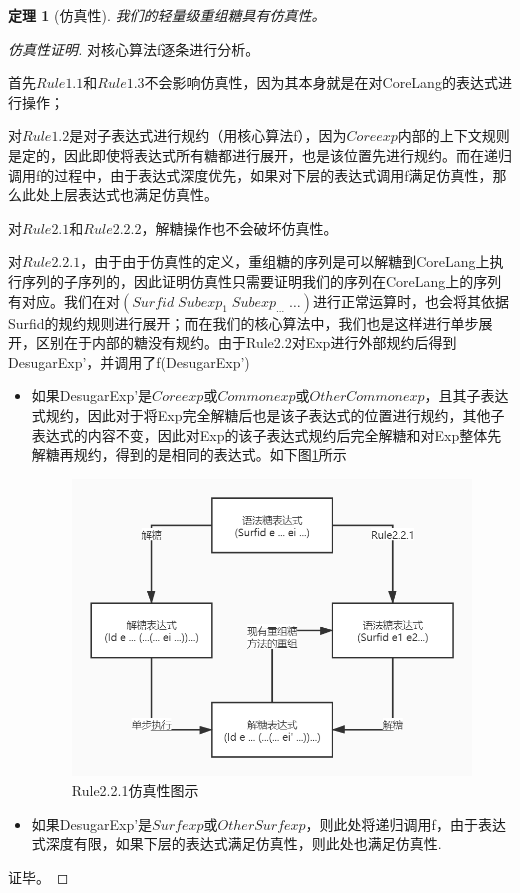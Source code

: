 \newtheorem{mythm}{定理}[section]
\begin{mythm}[仿真性]
	我们的轻量级重组糖具有仿真性。
\end{mythm}
\begin{proof}[仿真性证明]
	对核心算法f逐条进行分析。
	
	首先$Rule1.1$和$Rule1.3$不会影响仿真性，因为其本身就是在对CoreLang的表达式进行操作；
	
	对$Rule1.2$是对子表达式进行规约（用核心算法f），因为$Coreexp$内部的上下文规则是定的，因此即使将表达式所有糖都进行展开，也是该位置先进行规约。而在递归调用f的过程中，由于表达式深度优先，如果对下层的表达式调用f满足仿真性，那么此处上层表达式也满足仿真性。
	
	对$Rule2.1$和$Rule2.2.2$，解糖操作也不会破坏仿真性。
	
	对$Rule2.2.1$，由于由于仿真性的定义，重组糖的序列是可以解糖到CoreLang上执行序列的子序列的，因此证明仿真性只需要证明我们的序列在CoreLang上的序列有对应。我们在对$(Surfid\;Subexp_{1}\;Subexp_{\ldots}\;\ldots)$进行正常运算时，也会将其依据Surfid的规约规则进行展开；而在我们的核心算法中，我们也是这样进行单步展开，区别在于内部的糖没有规约。由于Rule2.2对Exp进行外部规约后得到DesugarExp'，并调用了f(DesugarExp')
	\begin{itemize}
		\item 如果DesugarExp'是$Coreexp$或$Commonexp$或$OtherCommonexp$，且其子表达式规约，因此对于将Exp完全解糖后也是该子表达式的位置进行规约，其他子表达式的内容不变，因此对Exp的该子表达式规约后完全解糖和对Exp整体先解糖再规约，得到的是相同的表达式。如下图\ref{fig:emulation}所示
		
		\begin{figure}[h]
			\centering
			\includegraphics[width=12cm]{images/chapter3/flowgraph.jpg}
			\caption{Rule2.2.1仿真性图示}
			\label{fig:emulation}
		\end{figure}
		
		\item 如果DesugarExp'是$Surfexp$或$OtherSurfexp$，则此处将递归调用f，由于表达式深度有限，如果下层的表达式满足仿真性，则此处也满足仿真性.
	\end{itemize}

证毕。

\end{proof}






